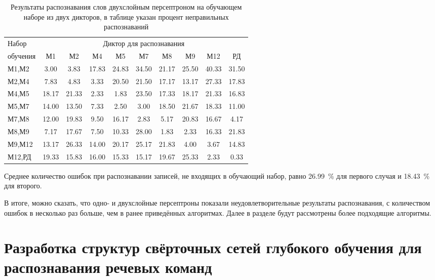 \begin{table}[h]
	\centering
	\caption{Результаты распознавания слов двухслойным персептроном на обучающем наборе из двух дикторов, в таблице указан процент неправильных распознаваний}
	\label{tab:mlp2_dictor2}
	\begin{tabular}{| l | c | c | c | c | c | c | c | c | c |}
		\hline
		Набор & \multicolumn{9}{c|}{Диктор для распознавания} \\
		\hhline{~---------}
		обучения \phantom{0000} & М1      & М2    	 & М4      & М5    	 & М7      & М8    	 & М9      & М12   	 & РД \\
		\hline
		М1,М2	 &  3.00 &  3.83 & 17.83 & 24.83 & 34.50 & 21.17 & 25.50 & 40.33 & 31.50 \\
		М2,М4	 &  7.83 &  4.83 &  3.33 & 20.50 & 21.50 & 17.17 & 13.17 & 27.33 & 17.83 \\
		М4,М5	 & 18.17 & 21.33 &  2.33 &  1.83 & 23.50 & 17.33 & 18.17 & 21.33 & 16.83 \\
		М5,М7	 & 14.00 & 13.50 &  7.33 &  2.50 &  3.00 & 18.50 & 21.67 & 18.33 & 11.00 \\
		М7,М8	 & 12.00 & 19.83 &  9.50 & 16.17 &  2.83 &  5.17 & 20.83 & 16.67 &  4.17 \\
		М8,М9	 &  7.17 & 17.67 &  7.50 & 10.33 & 28.00 &  1.83 &  2.33 & 16.33 & 21.83 \\
		М9,М12	 & 13.17 & 26.33 & 14.00 & 20.17 & 25.17 & 21.83 &  4.00 &  3.67 & 14.83 \\
		М12,РД	 & 19.33 & 15.83 & 16.00 & 15.33 & 15.17 & 19.67 & 25.33 &  2.33 &  0.33 \\
		\hline
	\end{tabular}
\end{table}

Среднее количество ошибок при распознавании записей, не входящих в обучающий набор, равно 26.99~\% для первого случая и 18.43~\% для второго.

В итоге, можно сказать, что одно- и двухслойные персептроны показали неудовлетворительные результаты распознавания, с количеством ошибок в несколько раз больше, чем в ранее приведённых алгоритмах.
Далее в разделе будут рассмотрены более подходящие алгоритмы.

\clearpage


\section{Разработка структур свёрточных сетей глубокого обучения для распознавания речевых команд} \label{sect4_2}


